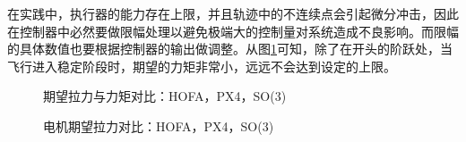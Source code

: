 在实践中，执行器的能力存在上限，并且轨迹中的不连续点会引起微分冲击，因此在控制器中必然要做限幅处理以避免极端大的控制量对系统造成不良影响。而限幅的具体数值也要根据控制器的输出做调整。从图\ref{matlab_fM}可知，除了在开头的阶跃处，当飞行进入稳定阶段时，期望的力矩非常小，远远不会达到设定的上限。
\begin{figure}[h]
  \centering
  \begin{minipage}[t]{0.33\textwidth}
    \centering
  \end{minipage}\hfill
  \begin{minipage}[t]{0.33\textwidth}
    \centering
  \end{minipage}\hfill
  \begin{minipage}[t]{0.33\textwidth}
    \centering
  \end{minipage}
  \caption{期望拉力与力矩对比：HOFA，PX4，SO(3)}
  \label{matlab_fM}
\end{figure}
\begin{figure}[h]
  \centering
  \begin{minipage}[t]{0.33\textwidth}
    \centering
  \end{minipage}\hfill
  \begin{minipage}[t]{0.33\textwidth}
    \centering
  \end{minipage}\hfill
  \begin{minipage}[t]{0.33\textwidth}
    \centering
  \end{minipage}
  \caption{电机期望拉力对比：HOFA，PX4，SO(3)}
  \label{matlab_f1234}
\end{figure}